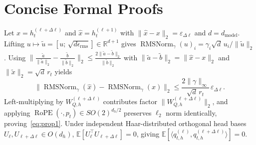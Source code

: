 \documentclass[10pt,journal,compsoc]{IEEEtran}
\theoremstyle{definition}
\theoremstyle{remark}
\newcommand{\RMSNorm}{\operatorname{RMSNorm}}
\newcommand{\RoPE}{\operatorname{RoPE}}
\newcommand{\R}{\mathbb{R}}
\newcommand{\E}{\mathbb{E}}
\begin{document}
\section{Concise Formal Proofs}\label{app:proofs}

\begin{IEEEproof}
Let $x = h_t^{(\ell+\Delta\ell)}$ and $\hat{x} = h_t^{(\ell+1)}$ with $\|\hat{x} - x\|_2 = \varepsilon_{\Delta\ell}$ and $d = d_{\mathrm{model}}$. Lifting $u \mapsto \tilde{u} = [u;\, \sqrt{d\epsilon_{\mathrm{rms}}}] \in \R^{d+1}$ gives $\RMSNorm_\gamma(u)_i = \gamma_i \sqrt{d}\, u_i / \|\tilde{u}\|_2$. Using $\|\frac{\tilde{a}}{\|\tilde{a}\|_2} - \frac{\tilde{b}}{\|\tilde{b}\|_2}\|_2 \le \frac{2\|\tilde{a} - \tilde{b}\|_2}{\|\tilde{b}\|_2}$ with $\|\tilde{a} - \tilde{b}\|_2 = \|\hat{x} - x\|_2$ and $\|\tilde{x}\|_2 = \sqrt{d}\, r_t$ yields
\begin{equation*}
\|\RMSNorm_\gamma(\hat{x}) - \RMSNorm_\gamma(x)\|_2 \le \frac{2\|\gamma\|_\infty}{\sqrt{d}\, r_t}\,\varepsilon_{\Delta\ell}.
\end{equation*}
Left-multiplying by $W_{Q,h}^{(\ell+\Delta\ell)}$ contributes factor $\|W_{Q,h}^{(\ell+\Delta\ell)}\|_2$, and applying $\RoPE(\cdot, p_t) \in SO(2)^{d_h/2}$ preserves $\ell_2$ norm identically, proving~\eqref{eq:prop1}. Under independent Haar-distributed orthogonal head bases $U_\ell, U_{\ell+\Delta\ell} \in O(d_h)$, $\E[U_\ell^\top U_{\ell+\Delta\ell}] = 0$, giving $\E[\langle q_{t,h}^{(\ell)}, q_{t,h}^{(\ell+\Delta\ell)}\rangle] = 0$.
\end{IEEEproof}
\end{document}
